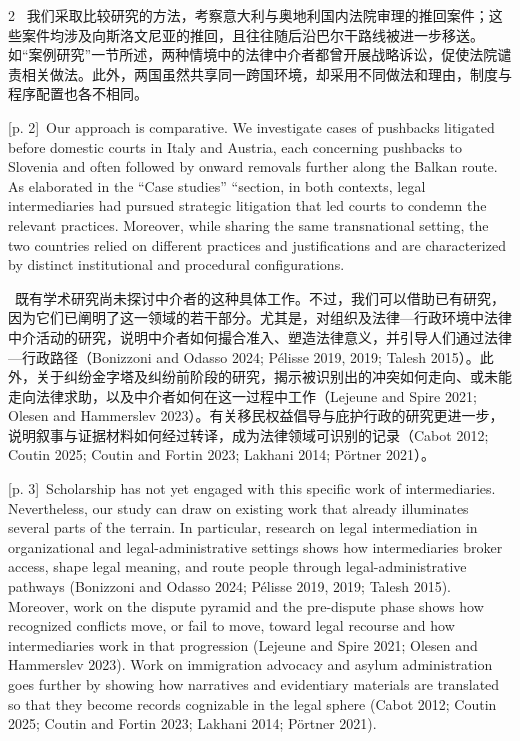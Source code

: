 \documentclass[10pt,a4paper]{article}
\begin{document}
\begin{paracol}{2}
\switchcolumn*
{\scriptsize\color{gray} [p. 2]}\ 我们采取比较研究的方法，考察意大利与奥地利国内法院审理的推回案件；这些案件均涉及向斯洛文尼亚的推回，且往往随后沿巴尔干路线被进一步移送。如“案例研究”一节所述，两种情境中的法律中介者都曾开展战略诉讼，促使法院谴责相关做法。此外，两国虽然共享同一跨国环境，却采用不同做法和理由，制度与程序配置也各不相同。\par
\switchcolumn
{\scriptsize\color{gray} [p. 2]}\ Our approach is comparative. We investigate cases of pushbacks litigated before domestic courts in Italy and Austria, each concerning pushbacks to Slovenia and often followed by onward removals further along the Balkan route. As elaborated in the “Case studies” “section, in both contexts, legal intermediaries had pursued strategic litigation that led courts to condemn the relevant practices. Moreover, while sharing the same transnational setting, the two countries relied on different practices and justifications and are characterized by distinct institutional and procedural configurations.\par
\switchcolumn*
{\scriptsize\color{gray} [p. 3]}\ 既有学术研究尚未探讨中介者的这种具体工作。不过，我们可以借助已有研究，因为它们已阐明了这一领域的若干部分。尤其是，对组织及法律—行政环境中法律中介活动的研究，说明中介者如何撮合准入、塑造法律意义，并引导人们通过法律—行政路径（Bonizzoni and Odasso 2024; Pélisse 2019, 2019; Talesh 2015）。此外，关于纠纷金字塔及纠纷前阶段的研究，揭示被识别出的冲突如何走向、或未能走向法律求助，以及中介者如何在这一过程中工作（Lejeune and Spire 2021; Olesen and Hammerslev 2023）。有关移民权益倡导与庇护行政的研究更进一步，说明叙事与证据材料如何经过转译，成为法律领域可识别的记录（Cabot 2012; Coutin 2025; Coutin and Fortin 2023; Lakhani 2014; Pörtner 2021）。\par
\switchcolumn
{\scriptsize\color{gray} [p. 3]}\ Scholarship has not yet engaged with this specific work of intermediaries. Nevertheless, our study can draw on existing work that already illuminates several parts of the terrain. In particular, research on legal intermediation in organizational and legal-administrative settings shows how intermediaries broker access, shape legal meaning, and route people through legal-administrative pathways (Bonizzoni and Odasso 2024; Pélisse 2019, 2019; Talesh 2015). Moreover, work on the dispute pyramid and the pre-dispute phase shows how recognized conflicts move, or fail to move, toward legal recourse and how intermediaries work in that progression (Lejeune and Spire 2021; Olesen and Hammerslev 2023). Work on immigration advocacy and asylum administration goes further by showing how narratives and evidentiary materials are translated so that they become records cognizable in the legal sphere (Cabot 2012; Coutin 2025; Coutin and Fortin 2023; Lakhani 2014; Pörtner 2021).\par

\end{paracol}
\end{document}
